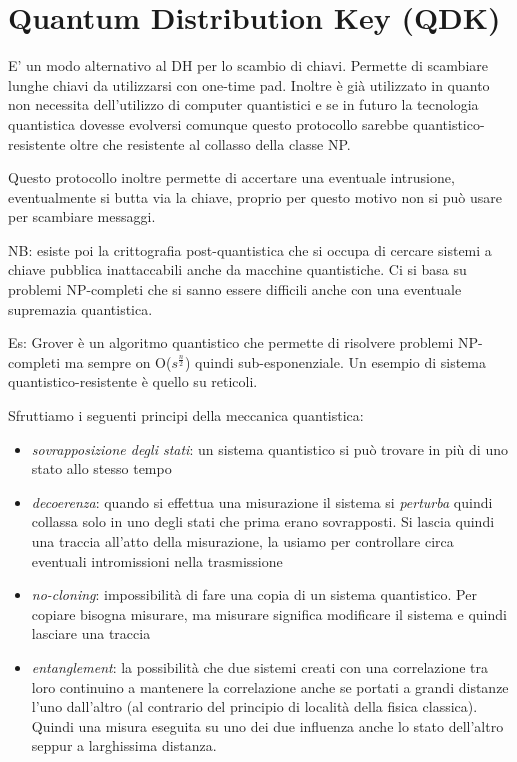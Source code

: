 \section{Quantum Distribution Key (QDK)}
E' un modo alternativo al DH per lo scambio di chiavi.
Permette di scambiare lunghe chiavi da utilizzarsi con one-time pad.
Inoltre è già utilizzato in quanto non necessita dell'utilizzo di computer quantistici e se in futuro la tecnologia quantistica dovesse evolversi comunque questo protocollo sarebbe quantistico-resistente oltre che resistente al collasso della classe NP.

Questo protocollo inoltre permette di accertare una eventuale intrusione, eventualmente si butta via la chiave, proprio per questo motivo non si può usare per scambiare messaggi.

NB: esiste poi la crittografia post-quantistica che si occupa di cercare sistemi a chiave pubblica inattaccabili anche da macchine quantistiche.
Ci si basa su problemi NP-completi che si sanno essere difficili anche con una eventuale supremazia quantistica.

Es: Grover è un algoritmo quantistico che permette di risolvere problemi NP-completi ma sempre on O($s^{\frac{n}{2}}$) quindi sub-esponenziale.
Un esempio di sistema quantistico-resistente è quello su reticoli.

Sfruttiamo i seguenti principi della meccanica quantistica:
\begin{itemize}
    \item \emph{sovrapposizione degli stati}: un sistema quantistico si può trovare in più di uno stato allo stesso tempo
    \item \emph{decoerenza}: quando si effettua una misurazione il sistema si \emph{perturba} quindi collassa solo in uno degli stati che prima erano sovrapposti.
    Si lascia quindi una traccia all'atto della misurazione, la usiamo per controllare circa eventuali intromissioni nella trasmissione
    \item \emph{no-cloning}: impossibilità di fare una copia di un sistema quantistico.
    Per copiare bisogna misurare, ma misurare significa modificare il sistema e quindi lasciare una traccia
    \item \emph{entanglement}: la possibilità che due sistemi creati con una correlazione tra loro continuino a mantenere la correlazione anche se portati a grandi distanze l'uno dall'altro (al contrario del principio di località della fisica classica).
    Quindi una misura eseguita su uno dei due influenza anche lo stato dell'altro seppur a larghissima distanza.
\end{itemize}

